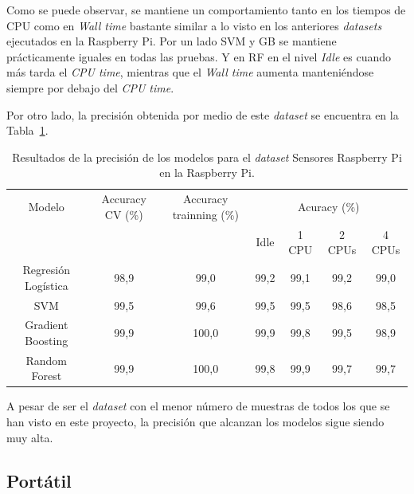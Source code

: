 \documentclass[a4paper, 12pt]{book}
\begin{document}
Como se puede observar, se mantiene un comportamiento tanto en los tiempos de CPU como en \textit{Wall time} bastante similar a lo visto en los anteriores \textit{datasets} ejecutados en la Raspberry Pi. Por un lado SVM y GB se mantiene prácticamente iguales en todas las pruebas. Y en RF en el nivel \textit{Idle} es cuando más tarda el \textit{CPU time}, mientras que el \textit{Wall time} aumenta manteniéndose siempre por debajo del \textit{CPU time}.

Por otro lado, la precisión obtenida por medio de este \textit{dataset} se encuentra en la Tabla~\ref{tab:acc_sensrasp}.\\
\begin{table}[htb]
\renewcommand{\arraystretch}{1.5}
\begin{adjustbox}{width=\textwidth}
\centering
    \begin{tabular}{c  c  c  c  c  c  c}
    \hline
    Modelo & Accuracy CV (\%) & Accuracy trainning (\%) & \multicolumn{4}{c}{Acuracy (\%)} \\
    \cline{4-7}
     &  &   &  Idle & 1 CPU & 2 CPUs & 4 CPUs \\
     \hline
     Regresión Logística & 98,9 & 99,0 & 99,2 & 99,1 & 99,2 & 99,0\\
     SVM & 99,5 & 99,6 & 99,5 & 99,5 & 98,6 & 98,5\\
     Gradient Boosting & 99,9 & 100,0 & 99,9 & 99,8 & 99,5 & 98,9\\
     Random Forest & 99,9 & 100,0 & 99,8 & 99,9 & 99,7 & 99,7\\
    \hline
    \end{tabular}
\end{adjustbox}
\caption{Resultados de la precisión de los modelos para el \textit{dataset} Sensores Raspberry Pi en la Raspberry Pi.}
\label{tab:acc_sensrasp}
\end{table}

A pesar de ser el \textit{dataset} con el menor número de muestras de todos los que se han visto en este proyecto, la precisión que alcanzan los modelos sigue siendo muy alta.

\subsection{Portátil}
\label{subsec:pc_sensados}
\end{document}
